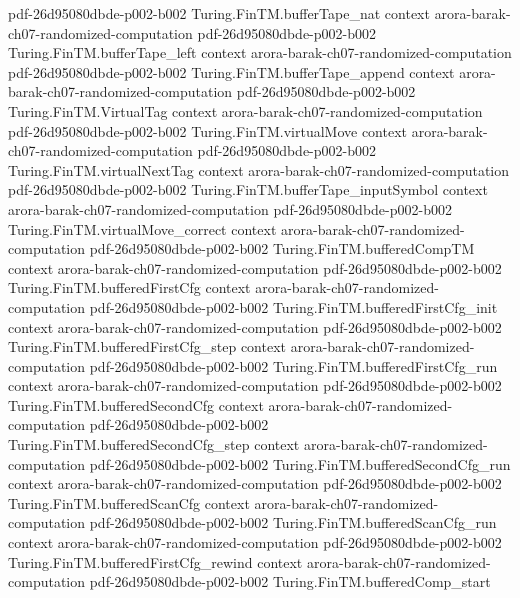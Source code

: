 \begin{theorem}
  {pdf-26d95080dbde-p002-b002}
\proofstep
  {Turing.FinTM.bufferTape_nat}
  {context}
  {arora-barak-ch07-randomized-computation}
  {pdf-26d95080dbde-p002-b002}
\proofstep
  {Turing.FinTM.bufferTape_left}
  {context}
  {arora-barak-ch07-randomized-computation}
  {pdf-26d95080dbde-p002-b002}
\proofstep
  {Turing.FinTM.bufferTape_append}
  {context}
  {arora-barak-ch07-randomized-computation}
  {pdf-26d95080dbde-p002-b002}
\proofstep
  {Turing.FinTM.VirtualTag}
  {context}
  {arora-barak-ch07-randomized-computation}
  {pdf-26d95080dbde-p002-b002}
\proofstep
  {Turing.FinTM.virtualMove}
  {context}
  {arora-barak-ch07-randomized-computation}
  {pdf-26d95080dbde-p002-b002}
\proofstep
  {Turing.FinTM.virtualNextTag}
  {context}
  {arora-barak-ch07-randomized-computation}
  {pdf-26d95080dbde-p002-b002}
\proofstep
  {Turing.FinTM.bufferTape_inputSymbol}
  {context}
  {arora-barak-ch07-randomized-computation}
  {pdf-26d95080dbde-p002-b002}
\proofstep
  {Turing.FinTM.virtualMove_correct}
  {context}
  {arora-barak-ch07-randomized-computation}
  {pdf-26d95080dbde-p002-b002}
\proofstep
  {Turing.FinTM.bufferedCompTM}
  {context}
  {arora-barak-ch07-randomized-computation}
  {pdf-26d95080dbde-p002-b002}
\proofstep
  {Turing.FinTM.bufferedFirstCfg}
  {context}
  {arora-barak-ch07-randomized-computation}
  {pdf-26d95080dbde-p002-b002}
\proofstep
  {Turing.FinTM.bufferedFirstCfg_init}
  {context}
  {arora-barak-ch07-randomized-computation}
  {pdf-26d95080dbde-p002-b002}
\proofstep
  {Turing.FinTM.bufferedFirstCfg_step}
  {context}
  {arora-barak-ch07-randomized-computation}
  {pdf-26d95080dbde-p002-b002}
\proofstep
  {Turing.FinTM.bufferedFirstCfg_run}
  {context}
  {arora-barak-ch07-randomized-computation}
  {pdf-26d95080dbde-p002-b002}
\proofstep
  {Turing.FinTM.bufferedSecondCfg}
  {context}
  {arora-barak-ch07-randomized-computation}
  {pdf-26d95080dbde-p002-b002}
\proofstep
  {Turing.FinTM.bufferedSecondCfg_step}
  {context}
  {arora-barak-ch07-randomized-computation}
  {pdf-26d95080dbde-p002-b002}
\proofstep
  {Turing.FinTM.bufferedSecondCfg_run}
  {context}
  {arora-barak-ch07-randomized-computation}
  {pdf-26d95080dbde-p002-b002}
\proofstep
  {Turing.FinTM.bufferedScanCfg}
  {context}
  {arora-barak-ch07-randomized-computation}
  {pdf-26d95080dbde-p002-b002}
\proofstep
  {Turing.FinTM.bufferedScanCfg_run}
  {context}
  {arora-barak-ch07-randomized-computation}
  {pdf-26d95080dbde-p002-b002}
\proofstep
  {Turing.FinTM.bufferedFirstCfg_rewind}
  {context}
  {arora-barak-ch07-randomized-computation}
  {pdf-26d95080dbde-p002-b002}
\proofstep
  {Turing.FinTM.bufferedComp_start}

\end{theorem}
